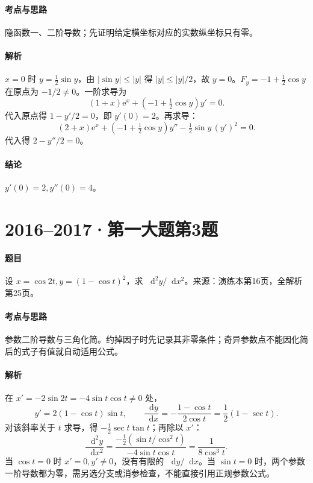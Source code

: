 \documentclass[UTF8,fontset=fandol,12pt,oneside,openany]{ctexrep}
\newcommand{\dd}{\mathop{}\!\mathrm d}
\newcommand{\ee}{\mathrm e}
\theoremstyle{definition}
\begin{document}
\paragraph{考点与思路}隐函数一、二阶导数；先证明给定横坐标对应的实数纵坐标只有零。
\paragraph{解析}$x=0$ 时 $y=\tfrac12\sin y$，由 $|\sin y|\le|y|$ 得 $|y|\le|y|/2$，故 $y=0$。$F_y=-1+\tfrac12\cos y$ 在原点为 $-1/2\ne0$。一阶求导为
\[
 (1+x)\ee^x+\left(-1+\tfrac12\cos y\right)y'=0.
\]
代入原点得 $1-y'/2=0$，即 $y'(0)=2$。再求导：
\[
 (2+x)\ee^x+\left(-1+\tfrac12\cos y\right)y''
 -\tfrac12\sin y\,(y')^2=0.
\]
代入得 $2-y''/2=0$。
\paragraph{结论}$y'(0)=2,y''(0)=4$。

\par\addvspace{18pt}\noindent\begin{minipage}{\linewidth}
\section{2016--2017·第一大题第3题}
\paragraph{题目}设 $x=\cos2t,y=(1-\cos t)^2$，求 $\dd^2y/\dd x^2$。来源：演练本第16页，全解析第25页。
\end{minipage}\par
\paragraph{考点与思路}参数二阶导数与三角化简。约掉因子时先记录其非零条件；奇异参数点不能因化简后的式子有值就自动适用公式。
\paragraph{解析}在 $x'=-2\sin2t=-4\sin t\cos t\ne0$ 处，
\[
 y'=2(1-\cos t)\sin t,
 \qquad \frac{\dd y}{\dd x}
 =-\frac{1-\cos t}{2\cos t}=\frac12(1-\sec t).
\]
对该斜率关于 $t$ 求导，得 $-\tfrac12\sec t\tan t$；再除以 $x'$：
\[
 \frac{\dd^2y}{\dd x^2}
 =\frac{-\tfrac12(\sin t/\cos^2t)}{-4\sin t\cos t}
 =\frac1{8\cos^3t}.
\]
当 $\cos t=0$ 时 $x'=0,y'\ne0$，没有有限的 $\dd y/\dd x$。当 $\sin t=0$ 时，两个参数一阶导数都为零，需另选分支或消参检查，不能直接引用正规参数公式。
\end{document}
